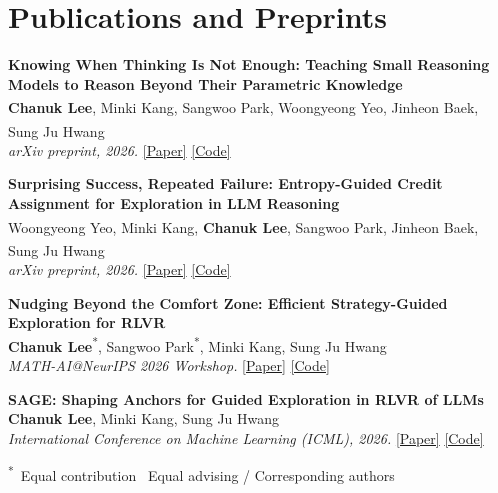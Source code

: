 \documentclass[a4paper,11pt]{article}
\newcommand{\equal}{\textsuperscript{*}}
\newcommand{\advising}{\textsuperscript{\dag}}
\newcommand{\corresponding}{\textsuperscript{\dag}}
\begin{document}
\section{Publications and Preprints}

\begin{enumerate}[leftmargin=1.8em,label={[\arabic*]},itemsep=6pt,topsep=2pt,parsep=0pt]
  \raggedright
  \item[{[4]}]
  \textbf{Knowing When Thinking Is Not Enough: Teaching Small Reasoning Models to
  Reason Beyond Their Parametric Knowledge}\\
  \textbf{Chanuk Lee}, Minki Kang, Sangwoo Park, Woongyeong Yeo,
  Jinheon Baek\advising, Sung Ju Hwang\advising\\
  \textit{arXiv preprint, 2026.}
  \href{https://arxiv.org/abs/2609.34327}{[Paper]}
  \href{https://github.com/tally0818/FlyBy}{[Code]}

  \item[{[3]}]
  \textbf{Surprising Success, Repeated Failure: Entropy-Guided Credit Assignment
  for Exploration in LLM Reasoning}\\
  Woongyeong Yeo, Minki Kang, \textbf{Chanuk Lee}, Sangwoo Park,
  Jinheon Baek\corresponding, Sung Ju Hwang\corresponding\\
  \textit{arXiv preprint, 2026.}
  \href{https://arxiv.org/abs/2609.33781}{[Paper]}
  \href{https://github.com/wgcyeo/EAPO}{[Code]}

  \item[{[2]}]
  \textbf{Nudging Beyond the Comfort Zone: Efficient Strategy-Guided Exploration
  for RLVR}\\
  \textbf{Chanuk Lee}\equal, Sangwoo Park\equal, Minki Kang, Sung Ju Hwang\\
  \textit{MATH-AI@NeurIPS 2026 Workshop.}
  \href{https://arxiv.org/abs/2605.15726}{[Paper]}
  \href{https://github.com/tally0818/NudgeRL}{[Code]}

  \item[{[1]}]
  \textbf{SAGE: Shaping Anchors for Guided Exploration in RLVR of LLMs}\\
  \textbf{Chanuk Lee}, Minki Kang, Sung Ju Hwang\\
  \textit{International Conference on Machine Learning (ICML), 2026.}
  \href{https://arxiv.org/abs/2605.18864}{[Paper]}
  \href{https://github.com/tally0818/SAGE}{[Code]}

\end{enumerate}
{\footnotesize \equal\ Equal contribution\quad
\advising\ Equal advising / Corresponding authors}
\end{document}

